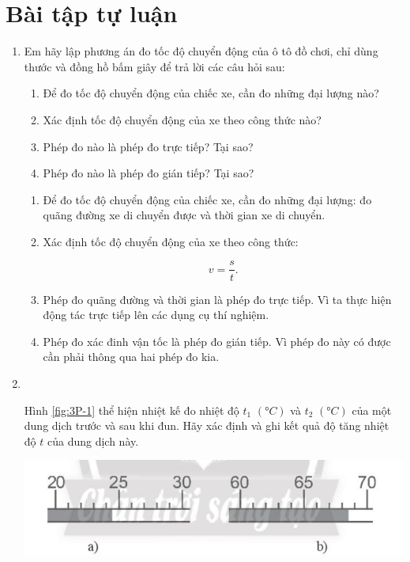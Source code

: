 \section{Bài tập tự luận}
\begin{enumerate}[label=\bfseries Bài \arabic*:]
	\item {}
	
	
	{
		Em hãy lập phương án đo tốc độ chuyển động của ô tô đồ chơi, chỉ dùng thước và đồng hồ bấm giây để trả lời các câu hỏi sau:
		\begin{enumerate}[label=\alph*)]
			\item Để đo tốc độ chuyển động của chiếc xe, cần đo những đại lượng nào?
			\item Xác định tốc độ chuyển động của xe theo công thức nào?
			\item Phép đo nào là phép đo trực tiếp? Tại sao?
			\item Phép đo nào là phép đo gián tiếp? Tại sao?
		\end{enumerate}
		
	}
	
	\hideall
	{	
		\begin{enumerate}[label=\alph*)]
			\item Để đo tốc độ chuyển động của chiếc xe, cần đo những đại lượng: đo quãng đường xe di chuyển được và thời gian xe di chuyển.
			\item Xác định tốc độ chuyển động của xe theo công thức:
			
			$$v = \dfrac{s}{t}.$$
			
			\item Phép đo quãng đường và thời gian là phép đo trực tiếp. Vì ta thực hiện động tác trực tiếp lên các dụng cụ thí nghiệm.
			\item Phép đo xác đinh vận tốc là phép đo gián tiếp. Vì phép đo này có được cần phải thông qua hai phép đo kia.
		\end{enumerate}
	}

\item {}\\
{Hình \ref{fig:3P-1} thể hiện nhiệt kế đo nhiệt độ $t_1$ $\left(\si{\degree C}\right)$ và $t_2$ $\left(\si{\degree C}\right)$ của một dung dịch trước và sau khi đun. Hãy xác định và ghi kết quả độ tăng nhiệt độ $t$ của dung dịch này.
	\begin{center}
		\includegraphics[width=0.4\linewidth]{../figs/VN10-2022-PH-TP003-P-1}
		\label{fig:3P-1}
	\end{center}
}


\end{enumerate}
